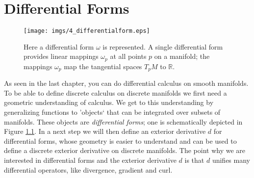 \chapter{Differential Forms}
\label{chap:diffforms}

\begin{figure}[h]%
\begin{center}
\texttt{[image: imgs/4\_differentialform.eps]}%
\end{center}

\caption{Here a differential form $\omega$ is represented. A single differential form provides linear mappings $\omega_p$ at all points $p$ on a manifold; the mappings $\omega_p$ map the tangential spaces $T_pM$ to $\mathbb R$.}%
\label{fig:4_differentialform}%
\end{figure}
As seen in the last chapter, you can do differential calculus on smooth manifolds. To be able to define discrete calculus on discrete manifolds we first need a geometric understanding of calculus. We get to this understanding by generalizing functions to 'objects` that can be integrated over subsets of manifolds. These objects are \emph{differential forms}; one is schematically depicted in Figure \ref{fig:4_differentialform}. In a next step we will then define an exterior derivative $d$ for differential forms, whose geometry is easier to understand and can be used to define a discrete exterior derivative on discrete manifolds.
 The point why we are interested in differential forms and the exterior derivative $d$ is that $d$ unifies many differential operators, like divergence, gradient and curl.


